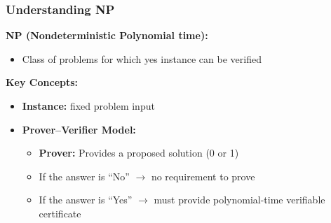 \documentclass[10pt,aspectratio=43]{beamer}
\begin{document}
\begin{frame}
  \frametitle{Understanding NP}
  
  \textbf{NP (Nondeterministic Polynomial time):}
  \begin{itemize}
      \item Class of problems for which yes instance can be verified
  \end{itemize}
  
  \vspace{0.3cm}
  
  \textbf{Key Concepts:}
  \begin{itemize}
      \item \textbf{Instance:} fixed problem input
      \vspace{0.2cm}
      \item \textbf{Prover–Verifier Model:}
      \begin{itemize}
          \item \textbf{Prover:} Provides a proposed solution (0 or 1)
          \item If the answer is ``No'' $\rightarrow$ no requirement to prove
          \item If the answer is ``Yes'' $\rightarrow$ must provide polynomial-time verifiable certificate
      \end{itemize}
  \end{itemize}
\end{frame}
\end{document}
